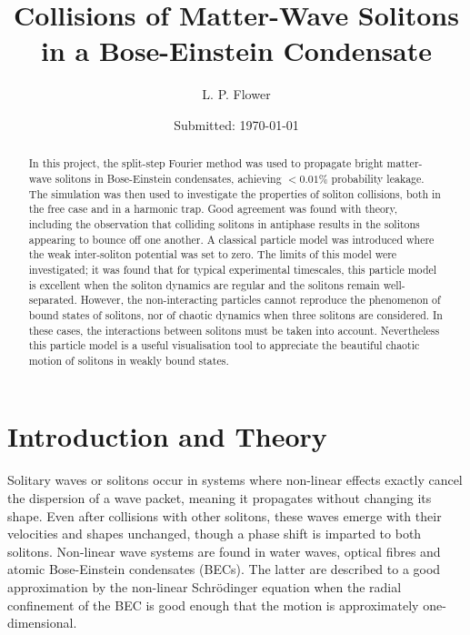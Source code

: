 \documentclass[10pt, twocolumn]{revtex4}    %
\begin{document}
                     


\title{Collisions of Matter-Wave Solitons in a Bose-Einstein Condensate} 
\date{Submitted: \today{}}
\author{L. P. Flower}

\begin{abstract}              
 
In this project, the split-step Fourier method was used to propagate bright matter-wave solitons in Bose-Einstein condensates, achieving $<0.01\%$ probability leakage. The simulation was then used to investigate the properties of soliton collisions, both in the free case and in a harmonic trap. Good agreement was found with theory, including the observation that colliding solitons in antiphase results in the solitons appearing to bounce off one another. A classical particle model was introduced where the weak inter-soliton potential was set to zero. The limits of this model were investigated; it was found that for typical experimental timescales, this particle model is excellent when the soliton dynamics are regular and the solitons remain well-separated. However, the non-interacting particles cannot reproduce the phenomenon of bound states of solitons, nor of chaotic dynamics when three solitons are considered. In these cases, the interactions between solitons must be taken into account. Nevertheless this particle model is a useful visualisation tool to appreciate the beautiful chaotic motion of solitons in weakly bound states.  

\end{abstract}

\maketitle
\thispagestyle{plain} %



\section{Introduction and Theory} \label{Intro}

Solitary waves or solitons occur in systems where non-linear effects exactly cancel the dispersion of a wave packet, meaning it propagates without changing its shape. Even after collisions with other solitons, these waves emerge with their velocities and shapes unchanged, though a phase shift is imparted to both solitons. Non-linear wave systems are found in water waves, optical fibres and atomic Bose-Einstein condensates (BECs). The latter are described to a good approximation by the non-linear Schr\"{o}dinger equation when the radial confinement of the BEC is good enough that the motion is approximately one-dimensional. 
\end{document}
